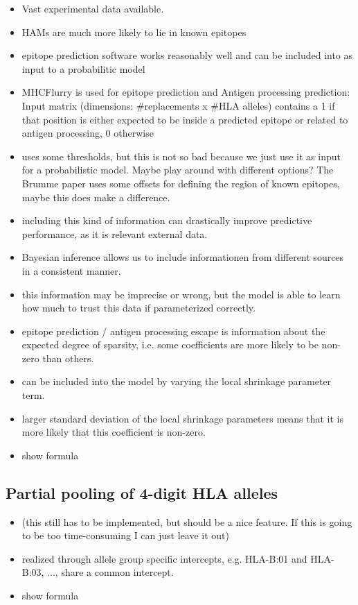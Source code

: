 \documentclass[fleqn,11pt]{SelfArx} %
\begin{document}
\begin{itemize}
  \item Vast experimental data available.
  \item HAMs are much more likely to lie in known epitopes
  \item epitope prediction software works reasonably well and can be included into as
    input to a probabilitic model
  \item MHCFlurry is used for epitope prediction and Antigen processing prediction: Input matrix (dimensions: \#replacements x \#HLA alleles) contains a 1 if that position is either expected to be inside a predicted epitope or related to antigen processing, 0 otherwise
  \item uses some thresholds, but this is not so bad because we just use it as input for a probabilistic model. Maybe play around with different options? The Brumme paper uses some offsets for defining the region of known epitopes, maybe this does make a difference.
  \item including this kind of information can drastically improve predictive performance, as it is relevant external data.
  \item Bayesian inference allows us to include informationen from different sources in a consistent manner.
  \item this information may be imprecise or wrong, but the model is able to learn how much to trust this data if parameterized correctly.
  \item epitope prediction / antigen processing escape is information about the expected degree of sparsity, i.e. some coefficients are more likely to be non-zero than others.
  \item can be included into the model by varying the local shrinkage parameter term.
  \item larger standard deviation of the local shrinkage parameters means that it is more likely that this coefficient is non-zero.
  \item show formula
\end{itemize}

\subsection*{Partial pooling of 4-digit HLA alleles}

\begin{itemize}
  \item (this still has to be implemented, but should be a nice feature. If this is going to be too time-consuming I can just leave it out)
  \item realized through allele group specific intercepts, e.g. HLA-B:01 and  HLA-B:03, ..., share a common intercept.
  \item show formula
\end{itemize}
\end{document}
